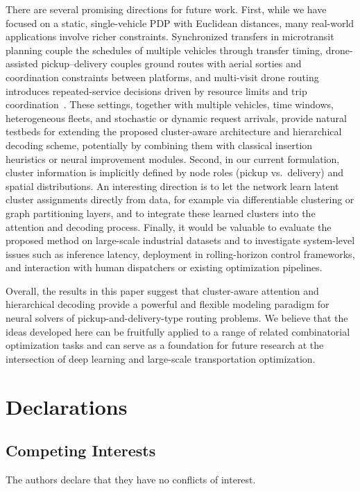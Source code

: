 \documentclass[pdflatex,sn-basic,Numbered]{sn-jnl}
\begin{document}
There are several promising directions for future work. First, while we have focused on a static, single-vehicle PDP with Euclidean distances, many real-world applications involve richer constraints. Synchronized transfers in microtransit planning couple the schedules of multiple vehicles through transfer timing, drone-assisted pickup--delivery couples ground routes with aerial sorties and coordination constraints between platforms, and multi-visit drone routing introduces repeated-service decisions driven by resource limits and trip coordination~\cite{fu2022microtransit,mulumba2024drone,meng2023multivisit}. These settings, together with multiple vehicles, time windows, heterogeneous fleets, and stochastic or dynamic request arrivals, provide natural testbeds for extending the proposed cluster-aware architecture and hierarchical decoding scheme, potentially by combining them with classical insertion heuristics or neural improvement modules. Second, in our current formulation, cluster information is implicitly defined by node roles (pickup vs.\ delivery) and spatial distributions. An interesting direction is to let the network learn latent cluster assignments directly from data, for example via differentiable clustering or graph partitioning layers, and to integrate these learned clusters into the attention and decoding process. Finally, it would be valuable to evaluate the proposed method on large-scale industrial datasets and to investigate system-level issues such as inference latency, deployment in rolling-horizon control frameworks, and interaction with human dispatchers or existing optimization pipelines.

Overall, the results in this paper suggest that cluster-aware attention and hierarchical decoding provide a powerful and flexible modeling paradigm for neural solvers of pickup-and-delivery-type routing problems. We believe that the ideas developed here can be fruitfully applied to a range of related combinatorial optimization tasks and can serve as a foundation for future research at the intersection of deep learning and large-scale transportation optimization.

\section*{Declarations}

\subsection*{Competing Interests}
The authors declare that they have no conflicts of interest.
\end{document}
